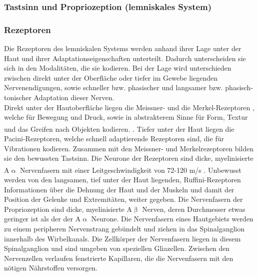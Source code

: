 \documentclass[12pt,a4paper,pdftex]{article}
\begin{document}
\subsubsection{Tastsinn und Propriozeption (lemniskales System)} \label{subsubsec:tastsinn}

\subsubsection*{Rezeptoren}
Die Rezeptoren  des lemniskalen Systems werden anhand ihrer Lage unter der Haut und ihrer Adaptationseigenschaften unterteilt. Dadurch unterscheiden sie sich in den Modalitäten, die sie kodieren. Bei der Lage wird unterschieden zwischen direkt unter der Oberfläche oder tiefer im Gewebe liegenden Nervenendigungen, sowie schneller bzw. phasischer und langsamer bzw. phasisch-tonischer Adaptation dieser Nerven.\\
Direkt unter der Hautoberfläche liegen die Meissner- und die Merkel-Rezeptoren , welche für Bewegung und Druck, sowie in abstrakterem Sinne für Form, Textur und das Greifen nach Objekten kodieren.
\textsuperscript{\cite[24]{paxinos2014rat}}. Tiefer unter der Haut liegen die Pacini-Rezeptoren, welche schnell adaptierende Rezeptoren sind, die für Vibrationen kodieren. Zusammen mit den Meissner- und Merkelrezeptoren bilden sie den bewussten Tastsinn. Die Neurone der Rezeptoren sind dicke, myelinisierte A$\upalpha$ Nervenfasern mit einer Leitgeschwindigkeit von 72-120 m/s \textsuperscript{\cite[22]{kandel2013principles}}. Unbewusst werden von den langsamen, tief unter der Haut liegenden, Ruffini-Rezeptoren  Informationen über die Dehnung der Haut und der Muskeln und damit der Position der Gelenke und Extremitäten, weiter gegeben.
Die Nervenfasern der Propriozeption sind dicke, myelinisierte A$\upbeta$ Nerven, deren Durchmesser etwas geringer ist als der der A$\upalpha$ Neurone.
Die Nervenfasern eines Hautgebiets werden zu einem peripheren Nervenstrang gebündelt und ziehen in das Spinalganglion  innerhalb des Wirbelkanals. Die Zellkörper der Nervenfasern liegen in diesem Spinalganglion und sind umgeben von speziellen Gliazellen. Zwischen den Nervenzellen verlaufen fenstrierte Kapillaren, die die Nervenfasern mit den nötigen Nährstoffen versorgen. 
\end{document}
